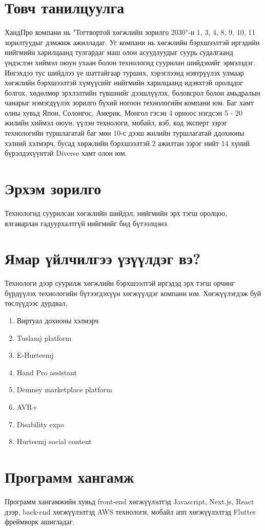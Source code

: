 \section{Товч танилцуулга}
	\quad \quad	ХандПро компани нь "Тогтвортой хөгжлийн зорилго 2030"-н 1, 3, 4, 8, 9, 10, 11 зорилтуудыг дэмжиж ажилладаг. Уг компани нь хөгжлийн бэрхшээлтэй иргэдийн нийгмийн харилцаанд тулгардаг маш олон асуудлуудыг суурь судалгаанд үндэслэн хиймэл оюун ухаан болон технологид суурилан шийдэхийг эрмэлздэг. Ингэхдээ тус шийдлээ үе шаттайгаар турших, хэрэглээнд нэвтрүүлэх улмаар хөгжлийн бэрхшээлтэй хүмүүсийг нийгмийн харилцаанд идэвхтэй оролцдог болгох, хөдөлмөр эрхлэлтийн түвшнийг дээшлүүлэх, боловсрол болон амьдралын чанарыг нэмэгдүүлэх зорилго бүхий ногоон технологийн компани юм. Баг хамт олны хувьд Япон, Солонгос, Америк, Монгол гэсэн 4 орноос нэгдсэн 5 - 20 жилийн хиймэл оюун, үүлэн технологи, мобайл, вэб, код эксперт зэрэг технологийн туршлагатай баг мөн 10-с дээш жилийн туршлагатай ддохионы хэлний хэлмэрч, бусад хөржлийн бэрхшээлтэй 2 ажилтан зэрэг нийт 14 хүний бүрэлдэхүүнтэй Diverse хамт олон юм.

\section{Эрхэм зорилго}
        \quad\quad Технологид суурилсан хөгжлийн шийдэл, нийгмийн эрх тэгш оролцоо, ялгаварлан гадуурхалтгүй нийгмийг бид бүтээлцэнэ.

\section{Ямар үйлчилгээ үзүүлдэг вэ?}
	\quad \quad	Технологи дээр суурилж хөгжлийн бэрхшээлтэй иргэдэд эрх тэгш орчинг бүрдүүлэх технологийн бүтээгдэхүүн хөгжүүлдэг компани юм. Хөгжүүлэгдэж буй төслүүдээс дурдвал,
     \begin{enumerate}
      \item Виртуал дохионы хэлмэрч
      \item Tuslamj platform
      \item E-Hurteemj
      \item Hand Pro assistant
      \item Demney marketplace platform
      \item AVR+
      \item Disability expo
      \item Hurteemj social content
    \end{enumerate}

 \section{Программ хангамж}
        \quad \quad Программ хангамжийн хувьд front-end хөгжүүлэлтэд Javascript, Next.js, React дээр, back-end хөгжүүлэлтэд AWS технологи, мобайл апп хөгжүүлэлтэд Flutter фреймворк ашигладаг. 


